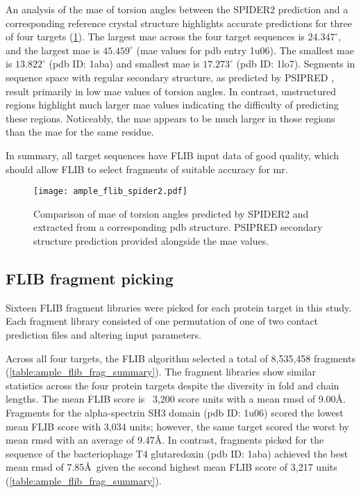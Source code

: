An analysis of the \gls{mae} of torsion angles between the SPIDER2 \cite{Heffernan2015-bt} prediction and a corresponding reference crystal structure highlights accurate predictions for three of four targets (\cref{fig:ample_flib_spider2}). The largest \gls{mae}\textsubscript{\textphi} across the four target sequences is $24.347^{\circ}$, and the largest \gls{mae}\textsubscript{\textpsi} is $45.459^{\circ}$ (\gls{mae} values for \gls{pdb} entry 1u06). The smallest \gls{mae}\textsubscript{\textphi} is $13.822^{\circ}$ (\gls{pdb} ID: 1aba) and smallest \gls{mae}\textsubscript{\textpsi} is $17.273^{\circ}$ (\gls{pdb} ID: 1lo7). Segments in sequence space with regular secondary structure, as predicted by PSIPRED \cite{Jones1999-ed}, result primarily in low \gls{mae} values of torsion angles. In contrast, unstructured regions highlight much larger \gls{mae} values indicating the difficulty of predicting these regions. Noticeably, the \gls{mae}\textsubscript{\textpsi} appears to be much larger in those regions than the \gls{mae}\textsubscript{\textphi} for the same residue.

In summary, all target sequences have FLIB input data of good quality, which should allow FLIB to select fragments of suitable accuracy for \gls{mr}.

\begin{figure}[H]
	\centering
	\texttt{[image: ample\_flib\_spider2.pdf]}
	\caption[SPIDER2 torsion angle prediction analysis of FLIB targets]{Comparison of \gls{mae} of torsion angles predicted by SPIDER2 and extracted from a corresponding \gls{pdb} structure. PSIPRED \cite{Jones1999-ed} secondary structure prediction provided alongside the \gls{mae} values.}
	\label{fig:ample_flib_spider2}
\end{figure}

\subsection{FLIB fragment picking}
Sixteen FLIB fragment libraries were picked for each protein target in this study. Each fragment library consisted of one permutation of one of two contact prediction files and altering input parameters.

Across all four targets, the FLIB algorithm selected a total of 8,535,458 fragments (\cref{table:ample_flib_frag_summary}). The fragment libraries show similar statistics across the four protein targets despite the diversity in fold and chain lengths. The mean FLIB score is ~3,200 score units with a mean \gls{rmsd} of 9.00\AA. Fragments for the alpha-spectrin SH3 domain (\gls{pdb} ID: 1u06) scored the lowest mean FLIB score with 3,034 units; however, the same target scored the worst by mean \gls{rmsd} with an average of 9.47\AA. In contrast, fragments picked for the sequence of the bacteriophage T4 glutaredoxin (\gls{pdb} ID: 1aba) achieved the best mean \gls{rmsd} of 7.85\AA\ given the second highest mean FLIB score of 3,217 units (\cref{table:ample_flib_frag_summary}).

